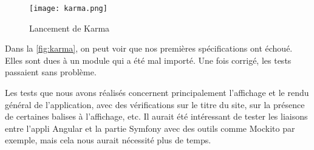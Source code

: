 \documentclass{polytech/polytech}
\begin{document}
\begin{figure}
	\texttt{[image: karma.png]}
	\caption{Lancement de Karma}
	\label{fig:karma}
\end{figure}

Dans la \autoref{fig:karma}, on peut voir que nos premières spécifications ont échoué. Elles sont dues à un module qui a été mal importé. Une fois corrigé, les tests passaient sans problème.

Les tests que nous avons réalisés concernent principalement l'affichage et le rendu général de l'application, avec des vérifications sur le titre du site, sur la présence de certaines balises à l'affichage, etc. Il aurait été intéressant de tester les liaisons entre l'appli Angular et la partie Symfony avec des outils comme Mockito par exemple, mais cela nous aurait nécessité plus de temps. 
\end{document}
